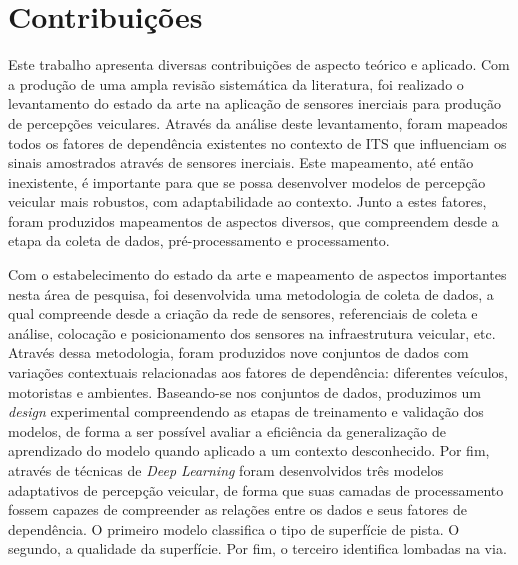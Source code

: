 \section{Contribuições}

Este trabalho apresenta diversas contribuições de aspecto teórico e aplicado. Com a produção de uma ampla revisão sistemática da literatura, foi realizado o levantamento do estado da arte na aplicação de sensores inerciais para produção de percepções veiculares. Através da análise deste levantamento, foram mapeados todos os fatores de dependência existentes no contexto de ITS que influenciam os sinais amostrados através de sensores inerciais. Este mapeamento, até então inexistente, é importante para que se possa desenvolver modelos de percepção veicular mais robustos, com adaptabilidade ao contexto. Junto a estes fatores, foram produzidos mapeamentos de aspectos diversos, que compreendem desde a etapa da coleta de dados, pré-processamento e processamento.

Com o estabelecimento do estado da arte e mapeamento de aspectos importantes nesta área de pesquisa, foi desenvolvida uma metodologia de coleta de dados, a qual compreende desde a criação da rede de sensores, referenciais de coleta e análise, colocação e posicionamento dos sensores na infraestrutura veicular, etc. Através dessa metodologia, foram produzidos nove conjuntos de dados com variações contextuais relacionadas aos fatores de dependência: diferentes veículos, motoristas e ambientes. Baseando-se nos conjuntos de dados, produzimos um \textit{design} experimental compreendendo as etapas de treinamento e validação dos modelos, de forma a ser possível avaliar a eficiência da generalização de aprendizado do modelo quando aplicado a um contexto desconhecido. Por fim, através de técnicas de \textit{Deep Learning} foram desenvolvidos três modelos adaptativos de percepção veicular, de forma que suas camadas de processamento fossem capazes de compreender as relações entre os dados e seus fatores de dependência. O primeiro modelo classifica o tipo de superfície de pista. O segundo, a qualidade da superfície. Por fim, o terceiro identifica lombadas na via.

